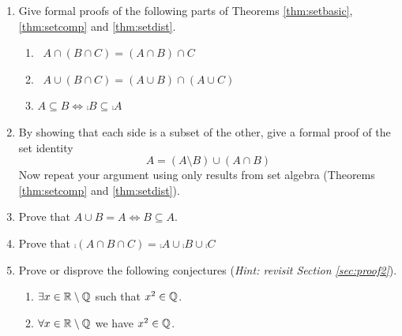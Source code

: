 \begin{exercises}{}{}
\begin{enumerate}
	\item Give formal proofs of the following parts of Theorems \ref{thm:setbasic}, \ref{thm:setcomp} and \ref{thm:setdist}. %
	\begin{enumerate}
	  \item {} \ $A\cap (B\cap C)=(A\cap B)\cap C$
	  \setcounter{enumii}{2}
		\item {} \ $A\cup(B\cap C)=(A\cup B)\cap(A\cup C)$
		\setcounter{enumii}{4}
		\item $A\subseteq B\iff \comp B\subseteq \comp A$
	\end{enumerate}


	\item By showing that each side is a subset of the other, give a formal proof of the set identity
	\[
		A=(A\setminus B)\cup (A\cap B)
	\]
	Now repeat your argument using only results from set algebra (Theorems \ref{thm:setcomp} and \ref{thm:setdist}).
	
	
	\item Prove that $A\cup B=A\iff B\subseteq A$.
	
	
	\item Prove that $\comp{(A\cap B\cap C)}=\comp A\cup\comp B\cup\comp C$
	
		
	  \item Prove or disprove the following conjectures (\emph{Hint: revisit Section \ref{sec:proof2}}).
	  \begin{enumerate}
	    \item $\exists x\in\mathbb{R}\setminus\mathbb{Q}$ such that $x^2\in\mathbb{Q}$.
	    \item $\forall x\in\mathbb{R}\setminus\mathbb{Q}$ we have $x^2\in\mathbb{Q}$.
		\end{enumerate}
	

\end{enumerate}
\end{exercises}
